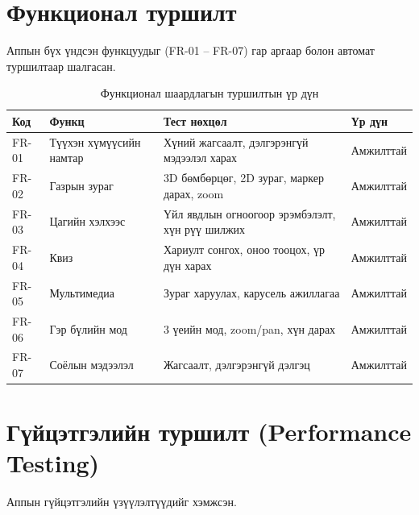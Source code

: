 \section{Функционал туршилт}

Аппын бүх үндсэн функцуудыг (FR-01 -- FR-07) гар аргаар болон автомат туршилтаар шалгасан.

\begin{table}[htbp]
\centering
\begin{tabular}{|p{1.2cm}|p{4cm}|p{5cm}|p{2cm}|}
\hline
\textbf{Код} & \textbf{Функц} & \textbf{Тест нөхцөл} & \textbf{Үр дүн} \\
\hline
FR-01 & Түүхэн хүмүүсийн намтар & Хүний жагсаалт, дэлгэрэнгүй мэдээлэл харах & Амжилттай \\
\hline
FR-02 & Газрын зураг & 3D бөмбөрцөг, 2D зураг, маркер дарах, zoom & Амжилттай \\
\hline
FR-03 & Цагийн хэлхээс & Үйл явдлын огноогоор эрэмбэлэлт, хүн рүү шилжих & Амжилттай \\
\hline
FR-04 & Квиз & Хариулт сонгох, оноо тооцох, үр дүн харах & Амжилттай \\
\hline
FR-05 & Мультимедиа & Зураг харуулах, карусель ажиллагаа & Амжилттай \\
\hline
FR-06 & Гэр бүлийн мод & 3 үеийн мод, zoom/pan, хүн дарах & Амжилттай \\
\hline
FR-07 & Соёлын мэдээлэл & Жагсаалт, дэлгэрэнгүй дэлгэц & Амжилттай \\
\hline
\end{tabular}
\caption{Функционал шаардлагын туршилтын үр дүн}
\label{tab:functional_tests}
\end{table}

\section{Гүйцэтгэлийн туршилт (Performance Testing)}

Аппын гүйцэтгэлийн үзүүлэлтүүдийг хэмжсэн.


